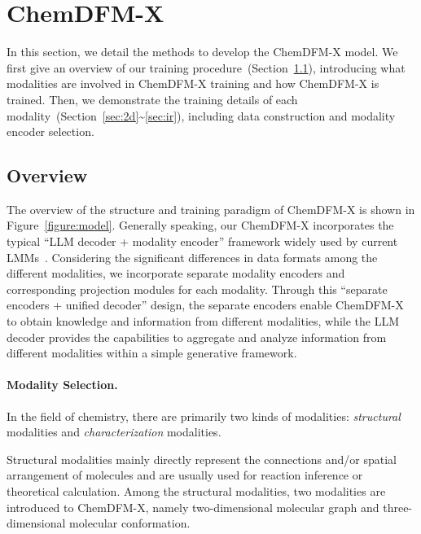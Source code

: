 \section{ChemDFM-X}

In this section, we detail the methods to develop the ChemDFM-X model. We first give an overview of our training procedure~(Section~\ref{sec:overview}), introducing what modalities are involved in ChemDFM-X training and how ChemDFM-X is trained. Then, we demonstrate the training details of each modality~(Section~\ref{sec:2d}\textasciitilde\ref{sec:ir}), including data construction and modality encoder selection.

\subsection{Overview}\label{sec:overview}

The overview of the structure and training paradigm of ChemDFM-X is shown in Figure~\ref{figure:model}. Generally speaking, our ChemDFM-X incorporates the typical ``LLM decoder + modality encoder'' framework widely used by current LMMs~\cite{liu2024improved,qwenvl}. Considering the significant differences in data formats among the different modalities, we incorporate separate modality encoders and corresponding projection modules for each modality. Through this ``separate encoders + unified decoder'' design, the separate encoders enable ChemDFM-X to obtain knowledge and information from different modalities, while the LLM decoder provides the capabilities to aggregate and analyze information from different modalities within a simple generative framework.

\paragraph{Modality Selection.} In the field of chemistry, there are primarily two kinds of modalities: \emph{structural} modalities and \emph{characterization} modalities.

Structural modalities mainly directly represent the connections and\slash or spatial arrangement of molecules and are usually used for reaction inference or theoretical calculation. Among the structural modalities, two modalities are introduced to ChemDFM-X, namely two-dimensional molecular graph and three-dimensional molecular conformation.

